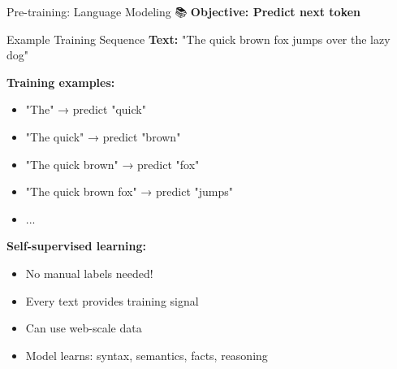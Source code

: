 \documentclass[aspectratio=169]{beamer}
\begin{document}
\begin{frame}[shrink=10]{Pre-training: Language Modeling 📚}
\small
    \textbf{Objective: Predict next token}

    \vspace{0.3cm}

    \begin{block}{Example Training Sequence}
        \textbf{Text:} "The quick brown fox jumps over the lazy dog"

        \vspace{0.3cm}

        \textbf{Training examples:}
        \begin{itemize}\setlength{\itemsep}{0pt}
            \item "The" → predict "quick"
            \item "The quick" → predict "brown"
            \item "The quick brown" → predict "fox"
            \item "The quick brown fox" → predict "jumps"
            \item ...
        \end{itemize}
    \end{block}

    \vspace{0.3cm}

    \textbf{Self-supervised learning:}
    \begin{itemize}\setlength{\itemsep}{0pt}
        \item No manual labels needed!
        \item Every text provides training signal
        \item Can use web-scale data
        \item Model learns: syntax, semantics, facts, reasoning
    \end{itemize}
\end{frame}
\end{document}
